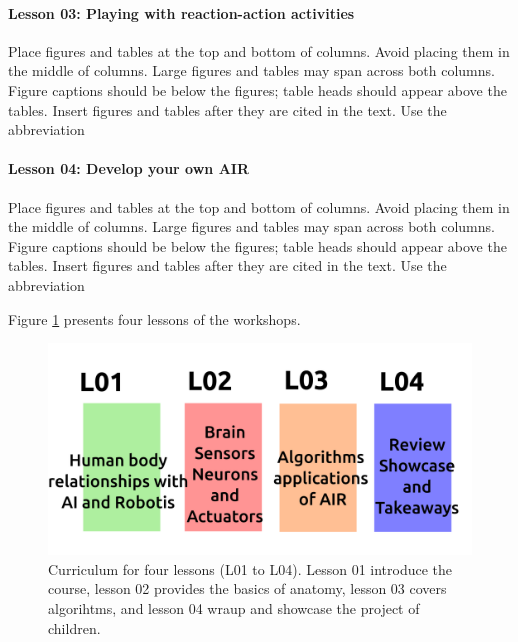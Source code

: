 \documentclass[conference]{IEEEtran}
\begin{document}
\paragraph{Lesson 03: Playing with reaction-action activities} 
Place figures and tables at the top and bottom of columns. Avoid placing them in the middle of columns. 
Large figures and tables may span across both columns. Figure captions should be below the figures; table heads should appear above the tables. 
Insert figures and tables after they are cited in the text. Use the abbreviation 

\paragraph{Lesson 04: Develop your own AIR} 
Place figures and tables at the top and bottom of columns. Avoid placing them in the middle of columns. 
Large figures and tables may span across both columns. Figure captions should be below the figures; table heads should appear above the tables. 
Insert figures and tables after they are cited in the text. Use the abbreviation 

Figure \ref{fig:curriculum} presents four lessons of the workshops.
\begin{figure}[htbp]
    \centerline{\includegraphics[width=\linewidth]{curriculum-design/versions/drawing-v00.png}}
    \caption{Curriculum for four lessons (L01 to L04). 
    Lesson 01 introduce the course, 
    lesson 02 provides the basics of anatomy, 
    lesson 03 covers algorihtms, and 
    lesson 04 wraup and showcase the project of children.
    }
    \label{fig:curriculum}
\end{figure}

\end{document}
